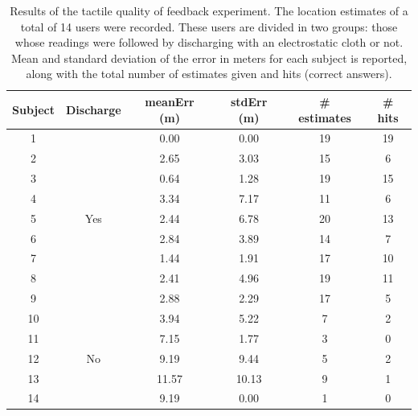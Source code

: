 \begin{table}
\centering
    \begin{tabular}{cccccc}
    
	Subject & Discharge      &  meanErr (m)      & stdErr (m)       &  \# estimates & \# hits \\ \hline
 		1 &	 \multirow{9}{*}{Yes} &	0.00                 & 0.00                & 19           & 19          \\ 
		2 &	    		&			    2.65 			  & 3.03 & 15           & 6           \\ 
		3 &	    		&			    0.64 			  & 1.28 & 19           & 15          \\ 
		4 &	    		&			    3.34 			  & 7.17 & 11           & 6           \\ 
		5 &	    		&			    2.44 			  & 6.78 & 20           & 13          \\ 
		6 &	    		&			    2.84 			  & 3.89 & 14           & 7           \\ 
		7 &	    		&			    1.44 			  & 1.91 & 17           & 10          \\ 
		8 &	    		&			    2.41 			  & 4.96 & 19           & 11          \\ 
		9 &	    		&			    2.88 			  & 2.29 & 17           & 5           \\ \hline

		10 &	 \multirow{5}{*}{No} & 3.94 				& 5.22 & 7            & 2           \\ 
		11 &	    		&			    7.15 			& 1.77 & 3            & 0           \\ 
		12 &	    		&			    9.19            & 9.44 & 5            & 2           \\ 
		13 &	    		&			    11.57 			& 10.13 & 9            & 1           \\ 
		14 &	    		&			    9.19            & 0.00                & 1            & 0           \\ \hline
    \end{tabular}
        \caption{Results of the tactile quality of feedback experiment. The location estimates of a total of 14 users were recorded. These users are divided in two groups: those whose readings were followed by discharging with an electrostatic cloth or not. Mean and standard deviation of the error in meters for each subject is reported, along with the total number of estimates given and hits (correct answers).}
    \label{tab:subjectResults}
\end{table}


